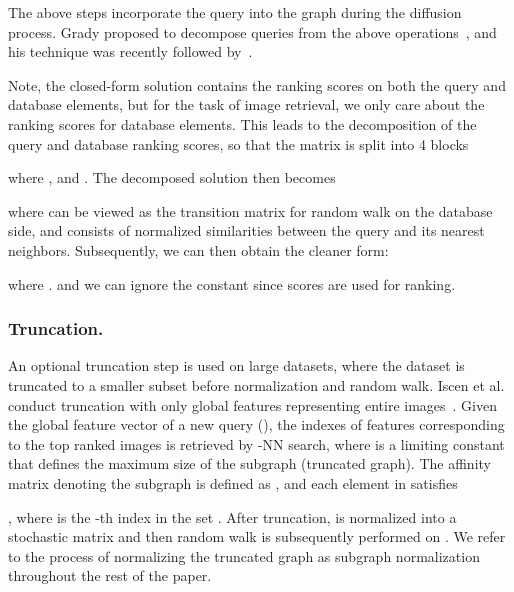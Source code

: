 \documentclass[letterpaper]{article} \usepackage{aaai19}  \usepackage{times}  \usepackage{helvet}  \usepackage{courier}  \usepackage{url}  \usepackage{graphicx}  \frenchspacing  \setlength{\pdfpagewidth}{8.5in}  \setlength{\pdfpageheight}{11in}
\begin{document}
The above steps incorporate the query into the graph during the diffusion process.
Grady proposed to decompose queries from the above operations~\cite{grady2006random}, and his technique was recently followed by~\cite{iscen2017efficient}.

Note, the closed-form solution  contains the ranking scores on both the query and database elements,
but for the task of image retrieval, we only care about the ranking scores for database elements.
This leads to the decomposition of the query and database ranking scores,
so that the matrix  is split into 4 blocks

where , and .
The decomposed solution then becomes

where  can be viewed as the transition matrix for random walk on the database side, and  consists of normalized similarities between the query and its nearest neighbors.
Subsequently, we can then obtain the cleaner form:

where .
and we can ignore the constant  since scores are used for ranking.
\subsubsection{Truncation.}
An optional truncation step is used on large datasets, where the dataset is truncated to a smaller subset before normalization and random walk.
Iscen et al. conduct truncation with only global features representing entire images~\cite{iscen2017efficient}.
Given the global feature vector  of a new query (), the indexes  of features corresponding to the top ranked images is retrieved by -NN search, where  is a limiting constant that defines the maximum size of the subgraph (truncated graph).
The affinity matrix denoting the subgraph is defined as , and each element  in  satisfies

, where  is the -th index in the set .
After truncation,  is normalized into a stochastic matrix  and then random walk is subsequently performed on .
We refer to the process of normalizing the truncated graph as subgraph normalization throughout the rest of the paper.
\end{document}
